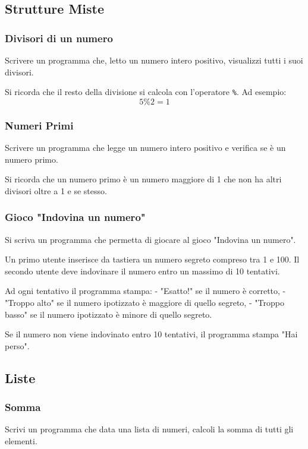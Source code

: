 \documentclass[a4paper,12pt]{article}
\begin{document}
\subsection{Strutture Miste}
\subsubsection{Divisori di un numero}
Scrivere un programma che, letto un numero intero positivo, visualizzi tutti i suoi divisori.

Si ricorda che il resto della divisione si calcola con l’operatore \texttt{\%}.  
Ad esempio:  
\[
5 \% 2 = 1
\]
	
	
	\subsubsection{Numeri Primi}
	Scrivere un programma che legge un numero intero positivo e verifica se è un numero primo.
	
	Si ricorda che un numero primo è un numero maggiore di 1 che non ha altri divisori oltre a 1 e se stesso.
	
	
	
	\subsubsection{Gioco "Indovina un numero"}
	
	Si scriva un programma che permetta di giocare al gioco "Indovina un numero".  
	
	Un primo utente inserisce da tastiera un numero segreto compreso tra 1 e 100.  
	Il secondo utente deve indovinare il numero entro un massimo di 10 tentativi.  
	
	Ad ogni tentativo il programma stampa:
	- "Esatto!" se il numero è corretto,  
	- "Troppo alto" se il numero ipotizzato è maggiore di quello segreto,  
	- "Troppo basso" se il numero ipotizzato è minore di quello segreto.  
	
	Se il numero non viene indovinato entro 10 tentativi, il programma stampa "Hai perso".
	
	
	\subsection{Liste}
	
	
	
	\subsubsection{Somma}
	Scrivi un programma che data una lista di numeri, calcoli la somma di tutti gli elementi.
	
\end{document}
